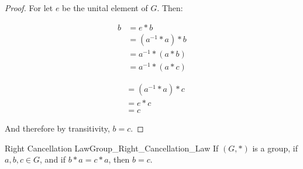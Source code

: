     \begin{proof}
        For let $e$ be the unital element of $G$. Then:
        \par
        \begin{minipage}[t]{0.49\textwidth}
            \centering
            \begin{align}
                b&=e*b
                \tag{Identity}\\
                &=(a^{\minus{1}}*a)*b
                \tag{Inverse}\\
                &=a^{\minus{1}}*(a*b)
                \tag{Associativity}\\
                &=a^{\minus{1}}*(a*c)
                \tag{Hypothesis}
            \end{align}
        \end{minipage}
        \hfill
        \begin{minipage}[t]{0.49\textwidth}
            \centering
            \begin{align}
                &=(a^{\minus{1}}*a)*c
                \tag{Associativity}\\
                &=e*c
                \tag{Inverse}\\
                &=c
                \tag{Identity}
            \end{align}
        \end{minipage}
        \par\vspace{2.5ex}
        And therefore by transitivity, $b=c$.
    \end{proof}
    \begin{ltheorem}{Right Cancellation Law}{Group_Right_Cancellation_Law}
        If $(G,*)$ is a group, if $a,b,c\in{G}$, and if $b*a=c*a$, then $b=c$.
    \end{ltheorem}
